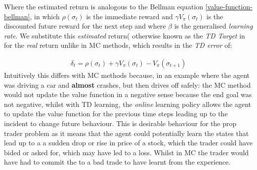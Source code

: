 \documentclass[ %
                    author={Ashwinder Khurana},
                supervisor={Prof Dave Cliff},
                    degree={MEng},
                     title={The Deeply Reinforced Trader},
                  subtitle={},
                      type={enterprise},
                      year={2020} ]{dissertation}
\begin{document}
{Where the estimated return is analogous to the Bellman equation \ref{value-function-bellman}, in which $\rho(\sigma_t)$ is the immediate reward and $\gamma V_\pi(\sigma_t)$ is the discounted future reward for the next step and where $\beta$ is the generalised \textit{learning rate}. We substitute this \textit{estimated} return( otherwise known as the \textit{TD Target} in for the \textit{real} return unlike in MC methods, which results in the \textit{TD error} of:

\begin{equation}
\label{TD error}
\begin{split}
\delta_t = \rho(\sigma_t) + \gamma V_\pi (\sigma_t) - V_\pi(\sigma_{t+1})
\end{split}
\end{equation}
\noindent
Intuitively this differs with MC methods because, in an example where the agent was driving a car and \textbf{almost} crashes, but then drives off safely: the MC method would not update the value function in a negative sense because the end goal was not negative, whilst with TD learning, the \textit{online} learning policy allows the agent to update the value function for the previous time steps leading up to the incident to change future behaviour. This is desirable behaviour for the prop trader problem as it means that the agent could potentially learn the states that lead up to a a sudden drop or rise in price of a stock, which the trader could have bided or asked for, which may have led to a loss. Whilst in MC the trader would have had to commit the to a bad trade to have learnt from the experience. 
\\
\\

}
\end{document}
